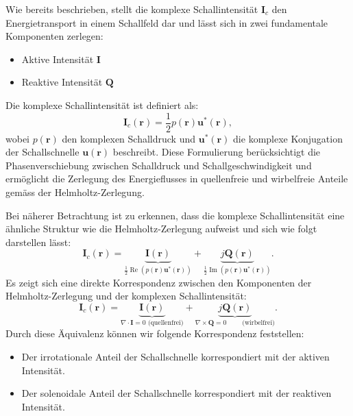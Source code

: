 Wie bereits beschrieben, stellt die komplexe Schallintensität $\boldsymbol{I}_c$ den Energietransport in einem Schallfeld dar und lässt sich in zwei fundamentale Komponenten zerlegen:
 
\begin{itemize}
\item Aktive Intensität $\boldsymbol{I}$
\item Reaktive Intensität $\boldsymbol{Q}$
\end{itemize}
Die komplexe Schallintensität ist definiert als:
\begin{equation}
\boldsymbol{I}_c (\boldsymbol{r})
=
\frac{1}{2} p(\boldsymbol{r})  \boldsymbol{u}^{*}(\boldsymbol{r}),
\end{equation}
wobei $p(\boldsymbol{r})$ den komplexen Schalldruck und $\boldsymbol{u}^{*}(\boldsymbol{r})$ die komplexe Konjugation der Schallschnelle $\boldsymbol{u}(\boldsymbol{r})$ beschreibt. Diese Formulierung berücksichtigt die Phasenverschiebung zwischen Schalldruck und Schallgeschwindigkeit und ermöglicht die Zerlegung des Energieflusses in quellenfreie und wirbelfreie Anteile gemäss der Helmholtz-Zerlegung.
 
Bei näherer Betrachtung ist zu erkennen, dass die komplexe Schallintensität eine ähnliche Struktur wie die Helmholtz-Zerlegung aufweist und sich wie folgt darstellen lässt:
\begin{equation}
\boldsymbol{I}_c (\boldsymbol{r})
=
\underbrace{\boldsymbol{I}(\boldsymbol{r})}_{\displaystyle\frac{1}{2}
\operatorname{Re} ( p(\boldsymbol{r}) \boldsymbol{u}^*(\boldsymbol{r}) )
}
+
\underbrace{j\boldsymbol{Q}(\boldsymbol{r})}_{\displaystyle\frac{1}{2}
\operatorname{Im} ( p(\boldsymbol{r}) \boldsymbol{u}^*(\boldsymbol{r}) )}.
\end{equation}
Es zeigt sich eine direkte Korrespondenz zwischen den Komponenten der Helmholtz-Zerlegung und der komplexen Schallintensität:
\begin{equation}
\boldsymbol{I}_c (\boldsymbol{r})
=
\underbrace{\boldsymbol{I}(\boldsymbol{r})}_{\displaystyle\nabla \cdot \boldsymbol{I}
=
0 \text{ (quellenfrei)}}
+
\underbrace{j\boldsymbol{Q}(\boldsymbol{r})}_{\displaystyle\nabla \times \boldsymbol{Q}
=
0\qquad \text{ (wirbelfrei)}}.
\end{equation}
Durch diese Äquivalenz können wir folgende Korrespondenz feststellen:
 
\begin{itemize}
\item Der irrotationale Anteil der Schallschnelle korrespondiert mit der aktiven Intensität.
\item Der solenoidale Anteil der Schallschnelle korrespondiert mit der reaktiven Intensität.
\end{itemize}

